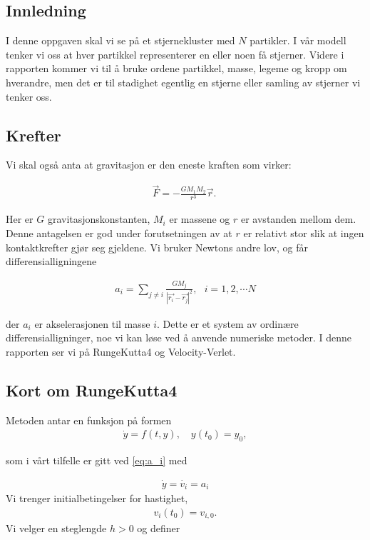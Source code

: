 \documentclass[11pt]{article}
\begin{document}
\begin{multicols}{2}



\section{Innledning}
I denne oppgaven skal vi se på et stjernekluster med $N$ partikler. 
I vår modell tenker
vi oss at hver partikkel representerer en eller noen få stjerner. 
Videre i rapporten kommer vi til å bruke ordene partikkel, masse, 
legeme og kropp om hverandre, men det er til stadighet egentlig
en stjerne eller samling av stjerner vi tenker oss.

\subsection{Krefter}
Vi
skal også anta at gravitasjon er den eneste kraften som virker:

\begin{align}
 \vec F = -\frac{GM_1M_2}{r^3}\vec r.\
\end{align}

Her er $G$ gravitasjonskonstanten, $M_i$ er massene og $r$ er avstanden mellom dem. 
Denne antagelsen er god under forutsetningen av at $r$ er relativt
stor slik at  ingen kontaktkrefter gjør seg gjeldene. Vi bruker
Newtons andre lov, og får differensialligningene 

\begin{align} \label{eq:a_i}
a_i = \sum_{j \neq i} \frac{GM_j}{{|\vec{r_i} - \vec{r_j}|}^2} , \ \ \
  i = 1,2, \cdots N 
\end{align}

der $a_i$ er akselerasjonen til masse $i$. Dette er et system av
ordinære differensialligninger, noe vi kan løse ved å anvende
numeriske metoder. I denne rapporten ser vi på RungeKutta4 og Velocity-Verlet.

\subsection{Kort om RungeKutta4~\small{\cite{RK4}}}
Metoden antar en funksjon på formen 
\begin{align*}
\dot{y} = f(t, y), \quad y(t_0) = y_0,
\end{align*}

som i vårt tilfelle er gitt ved \eqref{eq:a_i} med 

\begin{align*}
\dot y = \dot{v_i} = a_i 
\end{align*}
Vi trenger initialbetingelser for hastighet,
\begin{align*}
 v_i(t_0) = v_{i,0}.
\end{align*}
Vi velger en steglengde $h>0$ og definer 


\end{multicols}
\end{document}
